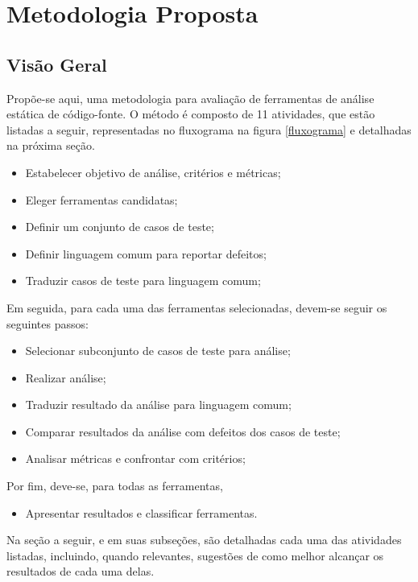 \chapter{Metodologia Proposta}\label{metodologia_proposta}

\section{Visão Geral}\label{metodologia_proposta:visao_geral}

Propõe-se aqui, uma metodologia para avaliação de ferramentas de análise estática de código-fonte. O método é composto de 11 atividades, que estão listadas a seguir, representadas no fluxograma na figura \ref{fluxograma} e detalhadas na próxima seção.

\begin{itemize}
  \item Estabelecer objetivo de análise, critérios e métricas;
  \item Eleger ferramentas candidatas;
  \item Definir um conjunto de casos de teste;
  \item Definir linguagem comum para reportar defeitos;
  \item Traduzir casos de teste para linguagem comum;
\end{itemize}

Em seguida, para cada uma das ferramentas selecionadas, devem-se seguir os seguintes passos:

\begin{itemize}
  \item Selecionar subconjunto de casos de teste para análise;
  \item Realizar análise;
  \item Traduzir resultado da análise para linguagem comum;
  \item Comparar resultados da análise com defeitos dos casos de  teste;
  \item Analisar métricas e confrontar com critérios;
\end{itemize}

Por fim, deve-se, para todas as ferramentas,
\begin{itemize}
  \item Apresentar resultados e classificar ferramentas.
\end{itemize}



Na seção a seguir,  e em suas subseções, são detalhadas cada uma das atividades listadas, incluindo, quando relevantes, sugestões de como melhor alcançar os resultados de cada uma delas.

